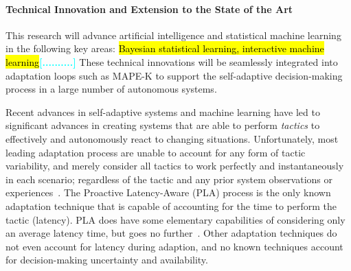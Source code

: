 \documentclass[12pt]{article}
\newcommand{\etal}{\emph{et~al.}\xspace}
\newcommand{\todo}[1]{\textcolor{cyan}{\textbf{[#1]}}}
\begin{document}





%   










\vspace{-0mm}\paragraph{Technical Innovation and Extension to the State of the Art}
This research will advance artificial intelligence and statistical machine learning in the following key areas: \hl{Bayesian statistical learning, interactive machine learning}\todo{..........} These technical innovations will be seamlessly integrated into adaptation loops such as MAPE-K to support the self-adaptive decision-making process in a large number of autonomous systems.

Recent advances in self-adaptive systems and machine learning have led to significant advances in creating systems that are able to perform \emph{tactics} to effectively and autonomously react to changing situations. Unfortunately, most leading adaptation process are unable to account for any form of tactic variability, and merely consider all tactics to work perfectly and instantaneously in each scenario; regardless of the tactic and any prior system observations or experiences~\cite{moreno2017adaptation}. The Proactive Latency-Aware (PLA)\cite{Moreno:2018:FED:3208359.3149180} process is the only known adaptation technique that is capable of accounting for the time to perform the tactic (latency). PLA does have some elementary capabilities of considering only an average latency time, but goes no further~\cite{moreno2017adaptation}. Other adaptation techniques do not even account for latency during adaption, and no known techniques account for decision-making uncertainty and availability.
\end{document}
